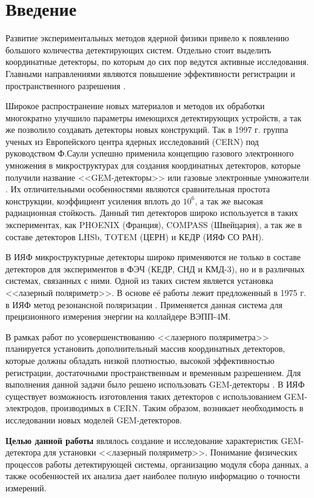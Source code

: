 \section{Введение}
\label{sec:intro}
Развитие экспериментальных методов ядерной физики привело к появлению большого количества детектирующих систем. Отдельно стоит выделить координатные детекторы, по которым до сих пор ведутся активные исследования. Главными направлениями являются повышение эффективности регистрации и пространственного разрешения \cite{shechtman}.
\par Широкое распространение новых материалов и методов их обработки многократно улучшило параметры имеющихся детектирующих устройств, а так же позволило создавать детекторы новых конструкций. Так в 1997 г. группа ученых из Европейского центра ядерных исследований (CERN) под руководством Ф.Саули успешно применила концепцию газового электронного умножения в микроструктурах для создания координатных детекторов, которые получили название <<GEM-детекторы>> или газовые электронные умножители \cite{sauli}. Их отличительными особенностями являются сравнительная простота конструкции, коэффициент усиления вплоть до $10^6$, а так же высокая радиационная стойкость. Данный тип детекторов широко используется в таких экспериментах, как PHOENIX (Франция), COMPASS (Швейцария), а так же в составе детекторов LHSb, TOTEM (ЦЕРН) и КЕДР (ИЯФ СО РАН).
\par В ИЯФ микроструктурные детекторы широко применяются не только в составе детекторов для экспериментов в ФЭЧ (КЕДР, СНД и КМД-3), но и в различных системах, связанных с ними. Одной из таких систем является установка <<лазерный поляриметр>>. В  основе её работы лежит предложенный в 1975 г. в ИЯФ метод резонансной поляризации \cite{bukin}. Применяется данная система для прецизионного измерения энергии на коллайдере ВЭПП-4М.
\par В рамках работ по усовершенствованию <<лазерного поляриметра>> планируется установить дополнительный массив координатных детекторов, которые должны обладать низкой плотностью, высокой эффективностью регистрации, достаточными пространственным и временным разрешением. Для выполнения данной задачи было решено использовать GEM-детекторы \cite{Bobr}. В ИЯФ существует возможность изготовления таких детекторов с использованием GEM-электродов, производимых в CERN. Таким образом, возникает необходимость в исследовании новых моделей GEM-детекторов.
\par \textbf{Целью данной работы} являлось создание и исследование характеристик GEM-детектора для установки <<лазерный поляриметр>>. Понимание физических процессов работы детектирующей системы, организацию модуля сбора данных, а также особенностей их анализа дает наиболее полную информацию о точности измерений.  
